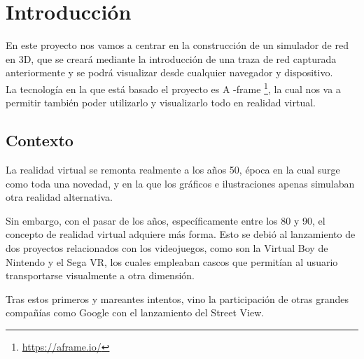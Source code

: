 \documentclass[a4paper, 12pt]{book}
\begin{document}

\cleardoublepage
\chapter{Introducción}
\label{sec:intro} %

En este proyecto nos vamos a centrar en la construcción de un simulador de red en 3D, que se creará mediante la introducción de una traza de red capturada anteriormente y se podrá visualizar desde cualquier navegador y dispositivo.\\
La tecnología en la que está basado el proyecto es A -frame
\footnote{\url{https://aframe.io/}}, la cual nos va a permitir también poder utilizarlo y visualizarlo todo en realidad virtual.

\section{Contexto}
\label{sec:seccion}
La realidad virtual se remonta realmente a los años 50, época en la cual surge como toda una novedad, y en la que los gráficos e ilustraciones apenas simulaban otra realidad alternativa.

Sin embargo, con el pasar de los años, específicamente entre los 80 y 90, el concepto de realidad virtual adquiere más forma. Esto se debió al lanzamiento de dos proyectos relacionados con los videojuegos, como son la Virtual Boy de Nintendo y el Sega VR, los cuales empleaban cascos que permitían al usuario transportarse visualmente a otra dimensión.

Tras estos primeros y mareantes intentos, vino la participación de otras grandes compañías como Google con el lanzamiento del Street View.
\end{document}

